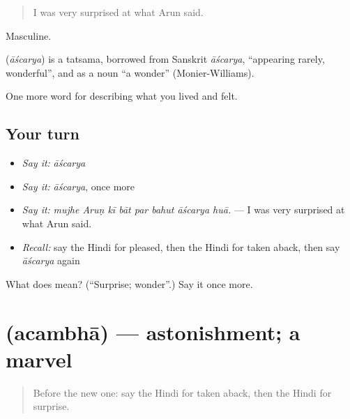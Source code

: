 \begin{quote}
I was very surprised at what Arun said.
\end{quote}

Masculine.

\begin{cousinweb}
\textbf{} (\emph{āścarya}) is a tatsama, borrowed from Sanskrit \emph{āścarya}, \textquotedblleft{}appearing rarely, wonderful\textquotedblright{}, and as a noun \textquotedblleft{}a wonder\textquotedblright{} (Monier-Williams).
\end{cousinweb}

\begin{grammarlens}[title={What you've built}]
One more word for describing what you lived and felt.
\end{grammarlens}

\subsection*{Your turn}
\begin{itemize}
\raggedright
  \item \emph{Say it:} \emph{āścarya}
  \item \emph{Say it:} \emph{āścarya}, once more
  \item \emph{Say it:} \emph{mujhe Aruṇ kī bāt par bahut āścarya huā.} — I was very surprised at what Arun said.
  \item \emph{Recall:} say the Hindi for pleased, then the Hindi for taken aback, then say \emph{āścarya} again
\end{itemize}

\begin{tcolorbox}[breakable,colback=teal!4,colframe=teal!35!black,title={Before you move on}]
What does  mean? (\textquotedblleft{}Surprise; wonder\textquotedblright{}.) Say it once more.
\end{tcolorbox}
\section[\texorpdfstring{\hi{अचंभा} (acambhā)}{अचंभा (acambhā)}]{ (acambhā) — astonishment; a marvel}

\label{lesson:HI-C454-acambha}



\begin{quote}
Before the new one: say the Hindi for taken aback, then the Hindi for surprise.
\end{quote}

